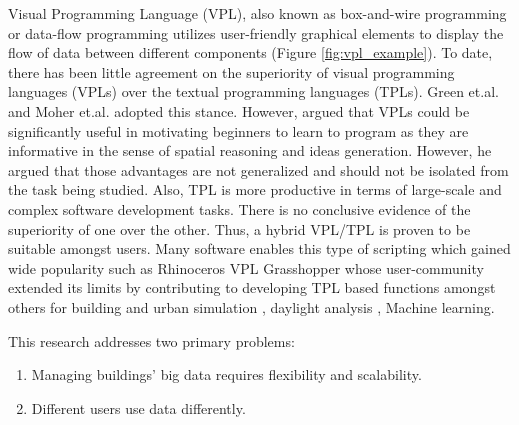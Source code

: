 \documentclass{scsSimAUDPaperFormat}
\begin{document}
Visual Programming Language (VPL), also known as box-and-wire programming or data-flow programming utilizes user-friendly graphical elements to display the flow of data between different components (Figure \ref{fig:vpl_example}). To date, there has been little agreement on the superiority of visual programming languages (VPLs) over the textual programming languages (TPLs). Green et.al. \cite{Green1991ComprehensibilityConjecture} and Moher et.al. \cite{Moher1993ComparingPrograms} adopted this stance. However, \cite{MENZIES2002EVALUATIONLANGUAGES} argued that VPLs could be significantly useful in motivating beginners to learn to program as they are informative in the sense of spatial reasoning and ideas generation. However, he argued that those advantages are not generalized and should not be isolated from the task being studied. Also, TPL is more productive in terms of large-scale and complex software development tasks. There is no conclusive evidence of the superiority of one over the other. Thus, a hybrid VPL/TPL is proven to be suitable amongst users. Many software enables this type of scripting which gained wide popularity such as Rhinoceros VPL Grasshopper\cite{Bachman2017Grasshopper:3D,McNeel2010GrasshopperRhino} whose user-community extended its limits by contributing to developing TPL based functions amongst others for building and urban simulation \cite{RoudsariLadybug:Design, PeronatoIntegratingCitySim,Koltsova2011ComponentsGeometry}, daylight analysis \cite{Jakubiec2011DIVAEnergyPlus,Lagios2010AnimatedDaysim}, Machine learning\cite{Abdelrahman2017EnhancingLanguage,AbdelRahman2017GH_CPython:Grasshopper,Abdelrahman2019ANT:Development}.

This research addresses two primary problems:
\begin{enumerate}
    \item Managing buildings' big data requires flexibility and scalability.
    \item Different users use data differently.
\end{enumerate} 
\end{document}
